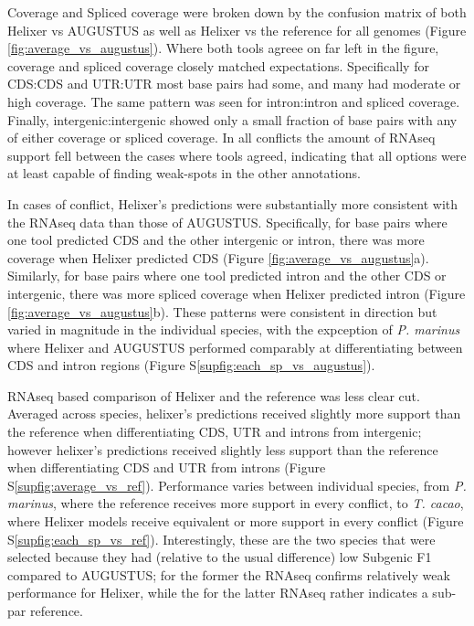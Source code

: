 \documentclass{bioinfo}
\newcounter{supfig}
\begin{document}
Coverage and Spliced coverage were broken down by the confusion matrix of both
Helixer vs AUGUSTUS as well as Helixer vs the reference for all genomes (Figure \ref{fig:average_vs_augustus}). 
Where both tools agreee on far left in the figure, coverage and spliced coverage closely matched expectations. 
Specifically for CDS:CDS and UTR:UTR most base pairs had some, and many
had moderate or high coverage. The same pattern was seen for intron:intron and spliced
coverage. Finally, intergenic:intergenic showed only a small fraction of base pairs with 
any of either coverage or spliced coverage. In all conflicts the amount of RNAseq support
fell between the cases where tools agreed, indicating that all options were at least
capable of finding weak-spots in the other annotations.

In cases of conflict, Helixer's predictions were substantially more consistent with
the RNAseq data than those of AUGUSTUS. Specifically, for base pairs where one tool predicted CDS and
the other intergenic or intron, there was more coverage when 
Helixer predicted CDS (Figure \ref{fig:average_vs_augustus}a). Similarly, for base pairs where one tool predicted intron and the other 
CDS or intergenic, there was more spliced coverage when Helixer predicted intron (Figure \ref{fig:average_vs_augustus}b). 
These patterns were consistent in direction but varied in magnitude in the individual species,
with the expception of {\it P. marinus} where Helixer and AUGUSTUS performed comparably
at differentiating between CDS and intron regions (Figure S\ref{supfig:each_sp_vs_augustus}).

RNAseq based comparison of Helixer and the reference was less clear cut.
Averaged across species, helixer's predictions received slightly more support
than the reference when differentiating CDS, UTR and introns from intergenic;
however helixer's predictions received slightly less support than the reference 
when differentiating CDS and UTR from introns (Figure S\ref{supfig:average_vs_ref}). Performance varies between individual
species, from {\it P. marinus}, where the reference receives more support
in every conflict, to {\it T. cacao}, where Helixer models receive equivalent
or more support in every conflict (Figure S\ref{supfig:each_sp_vs_ref}). Interestingly, these are the two species that
were selected because they had (relative to the usual difference) low Subgenic F1 compared to 
AUGUSTUS; for the former the RNAseq confirms relatively weak performance for Helixer, while the 
for the latter RNAseq rather indicates a sub-par reference. 
\end{document}
